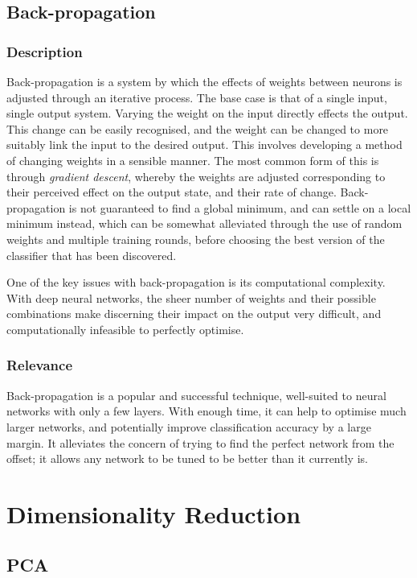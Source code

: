\subsection{Back-propagation}
\subsubsection{Description}
Back-propagation is a system by which the effects of weights between neurons is adjusted through an iterative process. The base case is that of a single input, single output system. 
Varying the weight on the input directly effects the output. This change can be easily recognised, and the weight can be changed to more suitably link the input to the desired output. This involves developing a method of changing weights in a sensible manner. The most common form of this is through \textit{gradient descent}, whereby the weights are adjusted corresponding to their perceived effect on the output state, and their rate of change. Back-propagation is not guaranteed to find a global minimum, and can settle on a local minimum instead, which can be somewhat alleviated through the use of random weights and multiple training rounds, before choosing the best version of the classifier that has been discovered. 

One of the key issues with back-propagation is its computational complexity. With deep neural networks, the sheer number of weights and their possible combinations make discerning their impact on the output very difficult, and computationally infeasible to perfectly optimise.

\subsubsection{Relevance}
Back-propagation is a popular and successful technique, well-suited to neural networks with only a few layers. With enough time, it can help to optimise much larger networks, and potentially improve classification accuracy by a large margin. It alleviates the concern of trying to find the perfect network from the offset; it allows any network to be tuned to be better than it currently is.

\section{Dimensionality Reduction}
\subsection{PCA}\label{lit:PCA}


